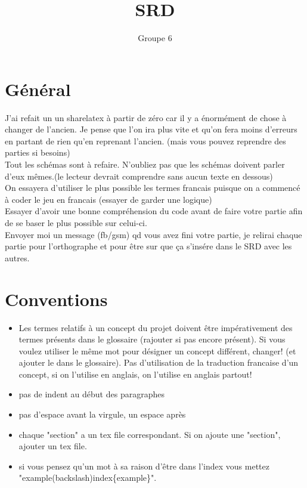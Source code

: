 \documentclass{article}
\title{SRD}
\author{Groupe 6}
\date{}
\begin{document}
\maketitle
\section{Général}
J'ai refait un un sharelatex à partir de zéro car il y a énormément de chose à changer de l'ancien. Je pense que l'on ira plus vite et qu'on fera moins d'erreurs en partant de rien qu'en reprenant l'ancien. (mais vous pouvez reprendre des parties si besoins)\\
Tout les schémas sont à refaire. N'oubliez pas que les schémas doivent parler d'eux mêmes.(le lecteur devrait comprendre sans aucun texte en dessous)\\
On essayera d'utiliser le plus possible les termes francais puisque on a commencé à coder le jeu en francais (essayer de garder une logique)\\
Essayer d'avoir une bonne compréhension du code avant de faire votre partie afin de se baser le plus possible sur celui-ci.\\
Envoyer moi un message (fb/gsm) qd vous avez fini votre partie, je relirai chaque partie pour l'orthographe et pour être sur que ça s'insére dans le SRD avec les autres.
\section{Conventions}
\begin{itemize}
\item Les termes relatifs à un concept du projet doivent être impérativement des termes présents dans le glossaire (rajouter si pas encore présent). Si vous voulez utiliser le même mot pour désigner un concept différent, changer! (et ajouter le dans le glossaire). Pas d'utilisation de la traduction francaise d'un concept, si on l'utilise en anglais, on l'utilise en anglais partout!
\item pas de indent au début des paragraphes
\item pas d'espace avant la virgule, un espace après
\item chaque "section" a un tex file correspondant. Si on ajoute une "section", ajouter un tex file.
\item si vous pensez qu'un mot à sa raison d'être dans l'index vous mettez "example(backslash)index\{example\}".
\end{itemize}
\end{document}
